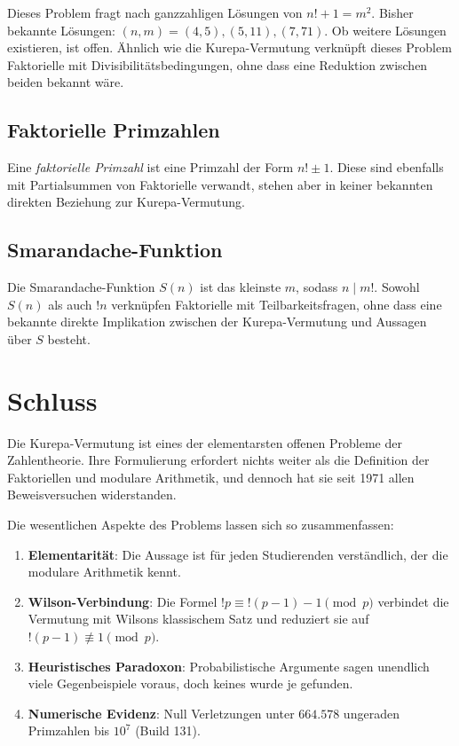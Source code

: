 \documentclass[12pt,a4paper]{amsart}
\theoremstyle{definition}
\begin{document}
Dieses Problem fragt nach ganzzahligen Lösungen von $n! + 1 = m^2$.
Bisher bekannte Lösungen: $(n, m) = (4, 5), (5, 11), (7, 71)$.
Ob weitere Lösungen existieren, ist offen.
Ähnlich wie die Kurepa-Vermutung verknüpft dieses Problem
Faktorielle mit Divisibilitätsbedingungen, ohne dass eine Reduktion zwischen
beiden bekannt wäre.

\subsection{Faktorielle Primzahlen}

Eine \emph{faktorielle Primzahl} ist eine Primzahl der Form $n! \pm 1$.
Diese sind ebenfalls mit Partialsummen von Faktorielle verwandt,
stehen aber in keiner bekannten direkten Beziehung zur Kurepa-Vermutung.

\subsection{Smarandache-Funktion}

Die Smarandache-Funktion $S(n)$ ist das kleinste $m$, sodass $n \mid m!$.
Sowohl $S(n)$ als auch $!n$ verknüpfen Faktorielle mit Teilbarkeitsfragen,
ohne dass eine bekannte direkte Implikation zwischen der Kurepa-Vermutung und
Aussagen über $S$ besteht.

\section{Schluss}
\label{sec:schluss}

Die Kurepa-Vermutung ist eines der elementarsten offenen Probleme der
Zahlentheorie.
Ihre Formulierung erfordert nichts weiter als die Definition der Faktoriellen
und modulare Arithmetik, und dennoch hat sie seit 1971 allen Beweisversuchen
widerstanden.

Die wesentlichen Aspekte des Problems lassen sich so zusammenfassen:

\begin{enumerate}
\item \textbf{Elementarität}: Die Aussage ist für jeden Studierenden verständlich,
      der die modulare Arithmetik kennt.
\item \textbf{Wilson-Verbindung}: Die Formel $!p \equiv !(p-1) - 1 \pmod p$
      verbindet die Vermutung mit Wilsons klassischem Satz und reduziert sie
      auf $!(p-1) \not\equiv 1 \pmod p$.
\item \textbf{Heuristisches Paradoxon}: Probabilistische Argumente sagen
      unendlich viele Gegenbeispiele voraus, doch keines wurde je gefunden.
\item \textbf{Numerische Evidenz}: Null Verletzungen unter $664{.}578$
      ungeraden Primzahlen bis $10^7$ (Build 131).
\end{enumerate}
\end{document}
